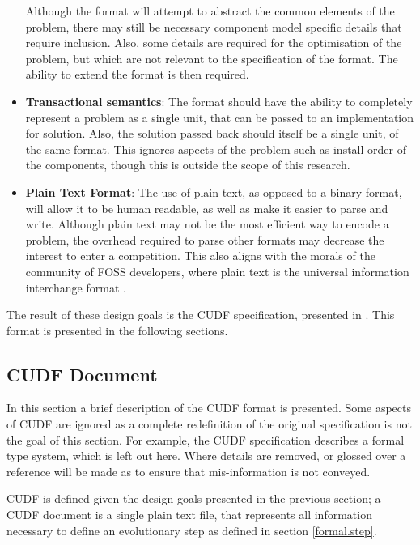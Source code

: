 \begin{itemize}
  Although the format will attempt to abstract the common elements of the problem, there may still be necessary component model specific details that require inclusion.
  Also, some details are required for the optimisation of the problem, but which are not relevant to the specification of the format.
  The ability to extend the format is then required.
  \item \textbf{Transactional semantics}:
  The format should have the ability to completely represent a problem as a single unit, that can be passed to an implementation for solution.
  Also, the solution passed back should itself be a single unit, of the same format.
  This ignores aspects of the problem such as install order of the components, though this is outside the scope of this research.
  \item \textbf{Plain Text Format}:
  The use of plain text, as opposed to a binary format, will allow it to be human readable, as well as make it easier to parse and write.
  Although plain text may not be the most efficient way to encode a problem, the overhead required to parse other formats may decrease the interest to enter a competition.
  This also aligns with the morals of the community of FOSS developers, where plain text is the universal information interchange format \cite{ray2003}.
\end{itemize}

The result of these design goals is the CUDF specification, presented in \cite{treinen2009common}.
This format is presented in the following sections.

\subsection{CUDF Document}
In this section a brief description of the CUDF format is presented.
Some aspects of CUDF are ignored as a complete redefinition of the original specification is not the goal of this section.
For example, the CUDF specification describes a formal type system, which is left out here.
Where details are removed, or glossed over a reference will be made as to ensure that mis-information is not conveyed. 

CUDF is defined given the design goals presented in the previous section;
a CUDF document is a single plain text file, that represents all information necessary to define an evolutionary step as defined in section \ref{formal.step}.

